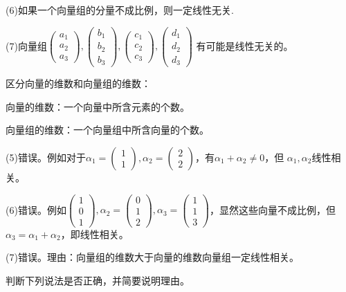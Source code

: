 \documentclass[a4paper]{report}
\begin{document}
(6)如果一个向量组的分量不成比例，则一定线性无关.

(7)向量组$
\begin{pmatrix}
a_1\\ a_2\\ a_3
\end{pmatrix},\begin{pmatrix}
b_1\\ b_2\\ b_3
\end{pmatrix},\begin{pmatrix}
c_1\\ c_2\\ c_3
\end{pmatrix},\begin{pmatrix}
d_1\\ d_2\\ d_3
\end{pmatrix}
$
有可能是线性无关的。

\begin{tips}
区分向量的维数和向量组的维数：

向量的维数：一个向量中所含元素的个数。

向量组的维数：一个向量组中所含向量的个数。
\end{tips}

\begin{jie}
(5)错误。例如对于$\alpha_1=
\begin{pmatrix}
1\\ 1
\end{pmatrix}
,\alpha_2=
\begin{pmatrix}
2\\ 2
\end{pmatrix}$，有$\alpha_1+\alpha_2\neq 0$，但 $\alpha_1,\alpha_2$线性相关。

(6)错误。例如$
\begin{pmatrix}
1\\ 0\\ 1
\end{pmatrix}
,\alpha_2=
\begin{pmatrix}
0\\ 1 \\2
\end{pmatrix},\alpha_3=
\begin{pmatrix}
1\\ 1 \\3
\end{pmatrix}$，显然这些向量不成比例，但$\alpha_3=\alpha_1+\alpha_2$，即线性相关。

(7)错误。理由：向量组的维数大于向量的维数向量组一定线性相关。
\end{jie}
\EX 判断下列说法是否正确，并简要说明理由。
\end{document}
